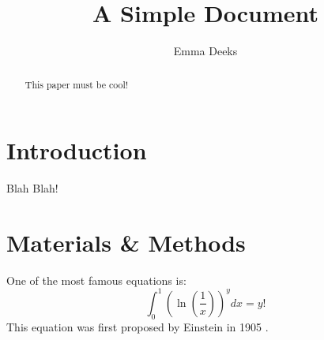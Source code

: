 \documentclass[12pt]{article}
\title{A Simple Document}
\author{Emma Deeks}
\date{}
\begin{document}
  \maketitle

  \begin{abstract}
    This paper must be cool!
  \end{abstract}

  \section{Introduction}
    Blah Blah!

  \section{Materials \& Methods}
  One of the most famous equations is:
  \begin{equation}
    \int_0^1 \left(\ln \left( \frac{1}{x} \right) 
    \right)^y dx = y!
  \end{equation}
  This equation was first proposed by Einstein in 1905 
  \cite{einstein1905does}.

  
  
\end{document}
